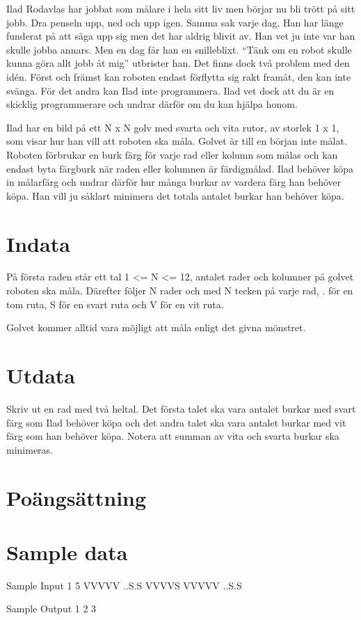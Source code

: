 
Ilad Rodavlas har jobbat som målare i hela sitt liv men börjar nu bli trött på sitt jobb. Dra penseln upp, ned och upp igen. Samma sak varje dag. Han har länge funderat på att säga upp sig men det har aldrig blivit av. Han vet ju inte var han skulle jobba annars. Men en dag får han en snilleblixt. “Tänk om en robot skulle kunna göra allt jobb åt mig” utbrister han. Det finns dock två problem med den  idén. Först och främst kan roboten endast förflytta sig rakt framåt, den kan inte svänga. För det andra kan Ilad inte programmera. Ilad vet dock att du är en skicklig programmerare och undrar därför om du kan hjälpa honom. 

Ilad har en bild på ett N x N golv med svarta och vita rutor, av storlek 1 x 1, som visar hur han vill att roboten ska måla. Golvet är till en början inte målat. Roboten förbrukar en burk färg för varje rad eller kolumn som målas och kan endast byta färgburk när raden eller kolumnen är färdigmålad. Ilad behöver köpa in målarfärg och undrar därför hur många burkar av vardera färg han behöver köpa. Han vill ju såklart minimera det totala antalet burkar han behöver köpa. 

\section*{Indata}

På första raden står ett tal 1 <= N <= 12, antalet rader och kolumner på golvet roboten ska måla. Därefter följer N rader och med N tecken på varje rad, . för en tom ruta, S för en svart ruta och V för en vit ruta.

Golvet kommer alltid vara möjligt att måla enligt det givna mönstret. 

\section*{Utdata}

Skriv ut en rad med två heltal. Det första talet ska vara antalet burkar med svart färg som Ilad behöver köpa och det andra talet ska vara antalet burkar med vit färg som han behöver köpa. Notera att summan av vita och svarta burkar ska minimeras. 

\section*{Poängsättning}

\section*{Sample data}
Sample Input 1
5
VVVVV
..S.S
VVVVS
VVVVV
..S.S

Sample Output 1
2 3